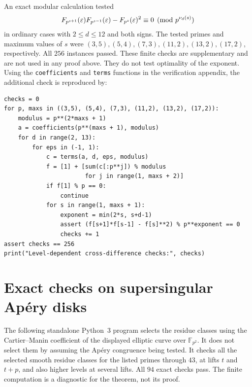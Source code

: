 \documentclass[11pt,letterpaper]{article}
\theoremstyle{definition}
\theoremstyle{remark}
\begin{document}
An exact modular calculation tested
\[
 F_{p^{s+1}}(\varepsilon)F_{p^{s-1}}(\varepsilon)-F_{p^s}(\varepsilon)^2
                   \equiv0\pmod{p^{\nu_d(s)}}
\]
in ordinary cases with $2\le d\le12$ and both signs.
The tested primes and maximum values of $s$ were
$(3,5),(5,4),(7,3),(11,2),(13,2),(17,2)$, respectively.
All $256$ instances passed.  These finite checks are supplementary and
are not used in any proof above.  They do not test optimality of the
exponent.
Using the \texttt{coefficients} and \texttt{terms} functions in the
verification appendix, the additional check is reproduced by:
\begin{lstlisting}
checks = 0
for p, maxs in ((3,5), (5,4), (7,3), (11,2), (13,2), (17,2)):
    modulus = p**(2*maxs + 1)
    a = coefficients(p**(maxs + 1), modulus)
    for d in range(2, 13):
        for eps in (-1, 1):
            c = terms(a, d, eps, modulus)
            f = [1] + [sum(c[:p**j]) % modulus
                       for j in range(1, maxs + 2)]
            if f[1] % p == 0:
                continue
            for s in range(1, maxs + 1):
                exponent = min(2*s, s+d-1)
                assert (f[s+1]*f[s-1] - f[s]**2) % p**exponent == 0
                checks += 1
assert checks == 256
print("Level-dependent cross-difference checks:", checks)
\end{lstlisting}


\section{Exact checks on supersingular Ap\'ery disks}

The following standalone Python~3 program selects the residue classes
using the Cartier--Manin coefficient of the displayed elliptic curve
over $\mathbb F_{p^2}$. It does not select them by assuming the Ap\'ery
congruence being tested. It checks all the selected smooth residue
classes for the listed primes through $43$, at lifts $t$ and $t+p$,
and also higher levels at several lifts. All $94$ exact checks pass.
The finite computation is a diagnostic for the theorem, not its proof.
\end{document}
